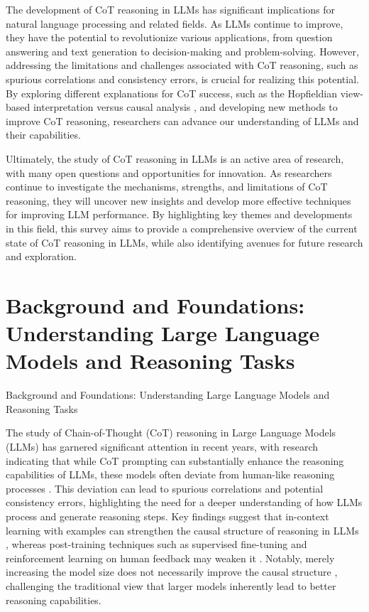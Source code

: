 \documentclass[conference]{IEEEtran}
\begin{document}
The development of CoT reasoning in LLMs has significant implications for natural language processing and related fields. As LLMs continue to improve, they have the potential to revolutionize various applications, from question answering and text generation to decision-making and problem-solving. However, addressing the limitations and challenges associated with CoT reasoning, such as spurious correlations and consistency errors, is crucial for realizing this potential. By exploring different explanations for CoT success, such as the Hopfieldian view-based interpretation \cite{b1} versus causal analysis \cite{b2}, and developing new methods to improve CoT reasoning, researchers can advance our understanding of LLMs and their capabilities.

Ultimately, the study of CoT reasoning in LLMs is an active area of research, with many open questions and opportunities for innovation. As researchers continue to investigate the mechanisms, strengths, and limitations of CoT reasoning, they will uncover new insights and develop more effective techniques for improving LLM performance. By highlighting key themes and developments in this field, this survey aims to provide a comprehensive overview of the current state of CoT reasoning in LLMs, while also identifying avenues for future research and exploration.

\section{Background and Foundations: Understanding Large Language Models and Reasoning Tasks}
Background and Foundations: Understanding Large Language Models and Reasoning Tasks

The study of Chain-of-Thought (CoT) reasoning in Large Language Models (LLMs) has garnered significant attention in recent years, with research indicating that while CoT prompting can substantially enhance the reasoning capabilities of LLMs, these models often deviate from human-like reasoning processes \cite{b1}. This deviation can lead to spurious correlations and potential consistency errors, highlighting the need for a deeper understanding of how LLMs process and generate reasoning steps. Key findings suggest that in-context learning with examples can strengthen the causal structure of reasoning in LLMs \cite{b2}, whereas post-training techniques such as supervised fine-tuning and reinforcement learning on human feedback may weaken it \cite{b3}. Notably, merely increasing the model size does not necessarily improve the causal structure \cite{b4}, challenging the traditional view that larger models inherently lead to better reasoning capabilities.
\end{document}
